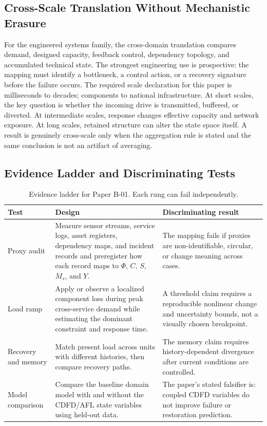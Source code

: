 \documentclass[11pt,a4paper]{article}
\begin{document}
\subsection{Cross-Scale Translation Without Mechanistic Erasure}

For the engineered systems family, the cross-domain translation compares demand, designed capacity, feedback control, dependency topology, and accumulated technical state. The strongest engineering use is prospective: the mapping must identify a bottleneck, a control action, or a recovery signature before the failure occurs. \cite{BarabasiAlbert1999,WattsStrogatz1998,Shannon1948,BakTangWiesenfeld1987}
The required scale declaration for this paper is milliseconds to decades; components to national infrastructure. At short
scales, the key question is whether the incoming drive is transmitted,
buffered, or diverted. At intermediate scales, response changes effective
capacity and network exposure. At long scales, retained structure can alter the
state space itself. A result is genuinely cross-scale only when the aggregation
rule is stated and the same conclusion is not an artifact of averaging.

\subsection{Evidence Ladder and Discriminating Tests}

\begin{table}[htbp]
\centering
\small
\caption{Evidence ladder for Paper B-01. Each rung can fail independently.}
\begin{tabularx}{\textwidth}{|p{}|X|X|}
\hline
\textbf{Test} & \textbf{Design} & \textbf{Discriminating result} \\
\hline
Proxy audit & Measure sensor streams, service logs, asset registers, dependency maps, and incident records and preregister how each record maps to $\Phi$, $C$, $S$, $M_s$, and $Y$. & The mapping fails if proxies are non-identifiable, circular, or change meaning across cases. \\
\hline
Load ramp & Apply or observe a localized component loss during peak cross-service demand while estimating the dominant constraint and response time. & A threshold claim requires a reproducible nonlinear change and uncertainty bounds, not a visually chosen breakpoint. \\
\hline
Recovery and memory & Match present load across units with different histories, then compare recovery paths. & The memory claim requires history-dependent divergence after current conditions are controlled. \\
\hline
Model comparison & Compare the baseline domain model with and without the CDFD/AFL state variables using held-out data. & The paper's stated falsifier is: coupled CDFD variables do not improve failure or restoration prediction. \\
\hline
\end{tabularx}
\end{table}
\end{document}
